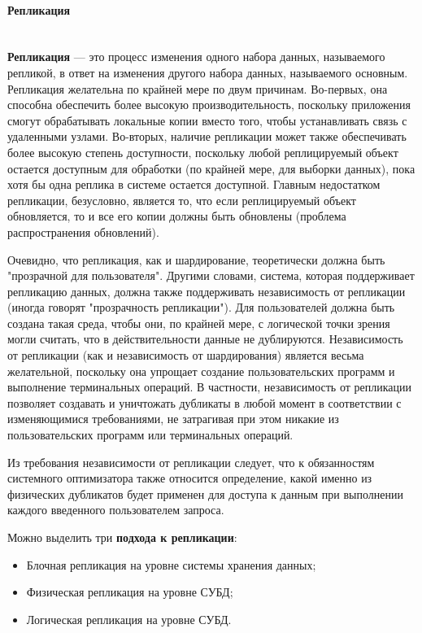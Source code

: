 \paragraph{Репликация} ~\\
\textbf{Репликация} — это процесс изменения одного набора данных, называемого репликой, в ответ на изменения другого
набора данных, называемого основным. Репликация желательна по крайней мере по двум причинам. Во-первых, она способна
обеспечить более высокую производительность, поскольку приложения смогут обрабатывать локальные копии вместо того,
чтобы устанавливать связь с удаленными узлами. Во-вторых, наличие репликации может также обеспечивать более высокую
степень доступности, поскольку любой реплицируемый объект остается доступным для обработки (по крайней мере, для выборки
данных), пока хотя бы одна реплика в системе остается доступной. Главным недостатком репликации, безусловно, является
то, что если реплицируемый объект обновляется, то и все его копии должны быть обновлены (проблема распространения
обновлений).

Очевидно, что репликация, как и шардирование, теоретически должна быть "прозрачной для пользователя". Другими словами,
система, которая поддерживает репликацию данных, должна также поддерживать независимость от репликации (иногда говорят
"прозрачность репликации"). Для пользователей должна быть создана такая среда, чтобы они, по крайней мере, с логической
точки зрения могли считать, что в действительности данные не дублируются. Независимость от репликации (как и
независимость от шардирования) является весьма желательной, поскольку она упрощает создание пользовательских программ и
выполнение терминальных операций. В частности, независимость от репликации позволяет создавать и уничтожать дубликаты в
любой момент в соответствии с изменяющимися требованиями, не затрагивая при этом никакие из пользовательских программ
или терминальных операций.

Из требования независимости от репликации следует, что к обязанностям системного оптимизатора также относится
определение, какой именно из физических дубликатов будет применен для доступа к данным при выполнении каждого
введенного пользователем запроса. \autocite{IntroBD2014}

Можно выделить три \textbf{подхода к репликации}:
\begin{itemize}
    \item Блочная репликация на уровне системы хранения данных;
    \item Физическая репликация на уровне СУБД;
    \item Логическая репликация на уровне СУБД.
\end{itemize}

